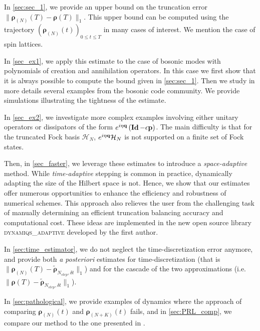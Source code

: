 \documentclass[a4paper,onecolumn,amsmath,amssymb,amsfonts,accepted=2026-03-06]{quantumarticle}
\newcommand{\Id}{\operatorname{\mathbf{Id}}}
\newcommand{\xH}{\mathcal{H}}
\newcommand{\qop}{{\bf q}}
\newcommand{\Pop}{{\bf p}}
\newcommand{\rN}{{\boldsymbol{\rho}_{(N)}}}
\begin{document}
In \cref{sec:sec_1}, we provide an upper bound on the truncation error $\|\rN(T)-\boldsymbol{\rho}(T)\|_1$. This upper bound can be computed using the trajectory $(\rN(t))_{0\leq t \leq T}$ in many cases of interest. We mention the case of spin lattices.

In \cref{sec_ex1}, we apply this estimate to the case of bosonic modes with polynomials of creation and annihilation operators. In this case we first show that it is always possible to compute the bound given in \cref{sec:sec_1}. Then we study in more details several examples from the bosonic code community. We provide simulations illustrating the tightness of the estimate.

In \cref{sec_ex2}, we investigate more complex examples involving either unitary operators or dissipators of the form $e^{i\eta\qop} \left( \Id-\epsilon\Pop\right)$. The main difficulty is that for the truncated Fock basis $\xH_N$, $e^{i\eta\qop}\xH_N$ is not supported on a finite set of Fock states.

Then, in \cref{sec_faster}, we leverage these estimates to introduce a \textit{space-adaptive} method. While \textit{time-adaptive} stepping is common in practice, dynamically adapting the size of the Hilbert space is not. Hence, we show that our estimates offer numerous opportunities to enhance the efficiency and robustness of numerical schemes. This approach also relieves the user from the challenging task of manually determining an efficient truncation balancing accuracy and computational cost. These ideas are implemented in the new open source library \textsc{dynamiqs\_adaptive} developed by the first author.

In \cref{sec:time_estimator}, we do not neglect the time-discretization error anymore, and provide both \textit{a posteriori} estimates for time-discretization (that is $\|\rN(T)-\tilde{ \boldsymbol{\rho}}_{N_{step},\delta t}\|_1$) and for the cascade of the two approximations (i.e. $\|\boldsymbol{\rho}(T)- \tilde{ \boldsymbol{\rho}}_{N_{step},\delta t}\|_1$).

In \cref{sec:pathological}, we provide examples of dynamics where the approach of comparing $\rN(t)$ and $\boldsymbol{\rho}_{(N+K)}(t)$ fails, and in \cref{sec:PRL_comp}, we compare our method to the one presented in \cite{PRL_estimator}.
\end{document}
